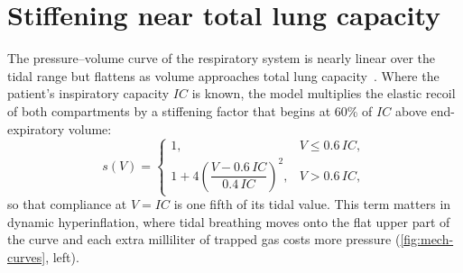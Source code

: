 \section{Stiffening near total lung capacity}
\label{sec:mech-pv}
The pressure--volume curve of the respiratory system is nearly linear over the tidal range but flattens as volume approaches total lung capacity~\citep{agostoni1964}. Where the patient's inspiratory capacity $IC$ is known, the model multiplies the elastic recoil of both compartments by a stiffening factor that begins at 60\% of $IC$ above end-expiratory volume:
\begin{equation}
s(V) = \begin{cases} 1, & V \le 0.6\,IC,\\[2pt] 1 + 4\left(\dfrac{V - 0.6\,IC}{0.4\,IC}\right)^{2}, & V > 0.6\,IC,\end{cases}
\label{eq:mech-stiff}
\end{equation}
so that compliance at $V = IC$ is one fifth of its tidal value. This term matters in dynamic hyperinflation, where tidal breathing moves onto the flat upper part of the curve and each extra milliliter of trapped gas costs more pressure (\cref{fig:mech-curves}, left).

